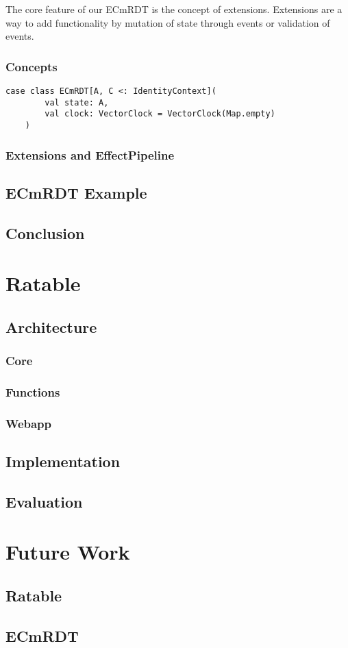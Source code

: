 \documentclass[
	ngerman,
	ruledheaders=section,   %
	class=report,		    %
	thesis={type=bachelor}, %
	accentcolor=9c,			%
	custommargins=false,    %
	marginpar=false,        %
	parskip=half-,          %
	fontsize=11pt,          %
]{tudapub}
\begin{document}
The core feature of our ECmRDT is the concept of extensions. Extensions are a way to add functionality by mutation of state through events or validation of events. 

\subsection{Concepts}

\begin{lstlisting}[frame=single]
	case class ECmRDT[A, C <: IdentityContext](
		val state: A,
		val clock: VectorClock = VectorClock(Map.empty)
	)
\end{lstlisting}

\subsection{Extensions and EffectPipeline}
\section{ECmRDT Example}
\section{Conclusion}

\chapter{Ratable}
\section{Architecture}
\subsection{Core}
\subsection{Functions}
\subsection{Webapp}
\section{Implementation}
\section{Evaluation}

\chapter{Future Work}
\section{Ratable}
\section{ECmRDT}

\printbibliography
\end{document}
